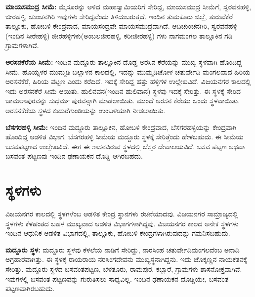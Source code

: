 \textbf{ಮಾಯಸಮುದ್ರ ಸೀಮೆ:} ಮೈಸೂರನ್ನು ಆಳಿದ ಮಹಾಸ್ವಾಮಿಯರಿಗೆ ಸೇರಿದ್ದ, ಮಾಯಸಮುದ್ರ ಸೀಮೆಗೆ, ಸ್ವರವನಹಳ್ಳಿ, ಜೀರಹಳ್ಳಿ, ಚುಂಚನಗಿರಿ ಇವುಗಳು ಸೇರಿದ್ದವೆಂದು ತಿಳಿದುಬರುತ್ತದೆ. ಇಂದಿನ ತುಮಕೂರು ಜಿಲ್ಲೆ, ತುರುವೆಕೆರೆ ತಾಲ್ಲೂಕು, ಹೋಬಳಿ ಕೇಂದ್ರವಾದ, ಮಾಯಸಂದ್ರವೇ ಮಾಯಸಮುದ್ರವಾಗಿದೆ. ಆದಿಚುಂಚನಗಿರಿ, ಸ್ವರವನಹಳ್ಳಿ (ಇಂದಿನ ಸೀರೇಹಳ್ಳಿ) ಜೀರಹಳ್ಳಿಗಳು(ಅಂಬಲಜೀರಹಳ್ಳಿ, ಕರೀಜೀರಹಳ್ಳಿ) ಗಳು ನಾಗಮಂಗಲ ತಾಲ್ಲೂಕಿನ ಗಡಿ ಗ್ರಾಮಗಳಾಗಿವೆ.

\textbf{ಅರಸನಕೆರೆಯ ಸೀಮೆ:} ಇಂದಿನ ಮದ್ದೂರು ತಾಲ್ಲೂಕಿನ ದೊಡ್ಡ ಅರಸಿನ ಕೆರೆಯನ್ನು ಮುಖ್ಯ ಸ್ಥಳವಾಗಿ ಹೊಂದಿದ್ದ ಸೀಮೆ. ಹೊಯ್ಸಳರ ಮುಮ್ಮಡಿ ಬಲ್ಲಾಳನ ಕಾಲದಲ್ಲಿ, ಇದನ್ನು ಮುಮ್ಮಡಿಚೋಳ ಚತುರ್ವೇದಿ ಮಂಗಲವಾದ ಹಿರಿಯ ಅರಸನಕೆರೆ, ಹಿರಿಯ ಪಟ್ಟಣ ಎಂದು ಕರೆದಿದೆ. ಇದಕ್ಕೆ ಸೇರಿದ್ದ ಹತ್ತು ಹಳ್ಳಿಗಳ ಉಲ್ಲೇಖವಿದೆ. ವಿಜಯನಗರ ಕಾಲದಲ್ಲಿ ಇದು ಅರಸನಕೆರೆ ಸೀಮೆ ಆಯಿತು. ಹುಲಿನವನ(ಇಂದಿನ ಹುಲಿವಾನ) ಸ್ಥಳವು ಇದಕ್ಕೆ ಸೇರಿತ್ತು. ಈ ಸ್ಥಳಕ್ಕೆ ಸೇರಿದ ಚಾಮಲಾಪುರವನ್ನು ಸುಧರ್ಮ ಪುರವನ್ನಾಗಿ ಮಾಡಲಾಯಿತು. ಮುಂದೆ ಅರಸನ ಕೆರೆಯು ಒಂದು ಸ್ಥಳವಾಯಿತು. ಅರಸನಕೆರೆಯ ಸ್ಥಳದ ಕುದುರೆಗುಂಡಿಯನ್ನು ಉಂಬಳಿಯಾಗಿ ನೀಡಲಾಯಿತು.

\textbf{ಬೆಸಗರಹಳ್ಳಿ ಸೀಮೆ:} ಇಂದಿನ ಮದ್ದೂರು ತಾಲ್ಲೂಕಿನ, ಹೋಬಳಿ ಕೇಂದ್ರವಾದ, ಬೆಸಗರಹಳ್ಳಿಯನ್ನು ಕೇಂದ್ರವಾಗಿ ಹೊಂದಿದ್ದ ಆಡಳಿತ ವಿಭಾಗ. ಬೆಸಗರಹಳ್ಳಿ ಸೀಮೆಯ ಮದ್ದೂರು ಸ್ಥಳಕ್ಕೆ ಸೇರಿತ್ತೆಂದು ಹೇಳಬಹುದು. ಈ ಸೀಮೆಯ ಬಸವಪಟ್ಟಣದ ಉಲ್ಲೇಖವಿದೆ. ಈಗ ಈ ಶಾಸನವಿರುವ ಸ್ಥಳದಲ್ಲಿ ಬೆಸ್ತರ ದೇವಾಲಯವಿದೆ. ಬಸವ ಪಟ್ಟಣ ಅಥವಾ ಬಸವಂತ ಪಟ್ಟಣವು ಇಂದಿನ ಢಣಾಯಕನ ದೊಡ್ಡಿ ಆಗಿರಬಹದು.

\section*{ಸ್ಥಳಗಳು}

ವಿಜಯನಗರ ಕಾಲದಲ್ಲಿ ಸ್ಥಳಗಳೆಂಬ ಆಡಳಿತ ಕೇಂದ್ರ ಸ್ಥಾನಗಳು ರಚನೆಯಾದವು. ವಿಜಯನಗರ ಸಾಮ್ರಾಜ್ಯದಲ್ಲಿ ಸ್ಥಳಗಳು ಕೆಳಹಂತದ ಬಹಳ ಮುಖ್ಯವಾದ ಆಡಳಿತ ವಿಭಾಗಗಳಾಗಿದ್ದವು. ವಿಜಯನಗರ ಕಾಲದ ಅನೇಕ ಸ್ಥಳಗಳು ಇಂದಿನ ಆಧುನಿಕ ಆಡಳಿತ ವಿಭಾಗದಲ್ಲಿ, ತಾಲ್ಲೂಕು, ಹೋಬಳಿ ಕೇಂದ್ರಗಳಾಗಿರುವುದನ್ನು ಗಮನಿಸಬಹುದು.

\textbf{ಮದ್ದೂರು ಸ್ಥಳ:} ಮದ್ದೂರು ಸ್ಥಳವು ಕೆಳಲೆಯ ನಾಡಿಗೆ ಸೇರಿದ್ದು, ನಾರಸಿಂಹ ಚತುರ್ವೇದಿಮಂಗಲವೆಂಬ ಅನಾದಿ ಅಗ್ರಹಾರವಾಗಿತ್ತು. ಈ ಸ್ಥಳಕ್ಕೆ ರಾಯರಾಯ ನರಸಿಂಗದೇವನು ಮುಖ್ಯಸ್ಥನಾಗಿದ್ದನು. ಇದು ಚೊಕ್ಕಣ್ಣನ ನಾಯಕತನಕ್ಕೆ ಸೇರಿತ್ತು. ಮದ್ದೂರು ಸ್ಥಳದ ಬಸವಂತಪಟ್ಟಣ, ಬೆಳತೂರು, ರಾಮಪುರ, ಕಬ್ಬಾರೆ, ಗ್ರಾಮಗಳು ಶಾಸನೋಕ್ತವಾಗಿವೆ. ಇವುಗಳಲ್ಲಿ ಬಸವಂತ ಪಟ್ಟಣವನ್ನು ಗುರುತಿಸಲು ಸಾಧ್ಯವಿಲ್ಲ. ಇಂದಿನ ಢಣಾಯಕನ ದೊಡ್ಡಿಯೇ, ಬಸವಂತ ಪಟ್ಟಣವಾಗಿರಬಹುದು.


